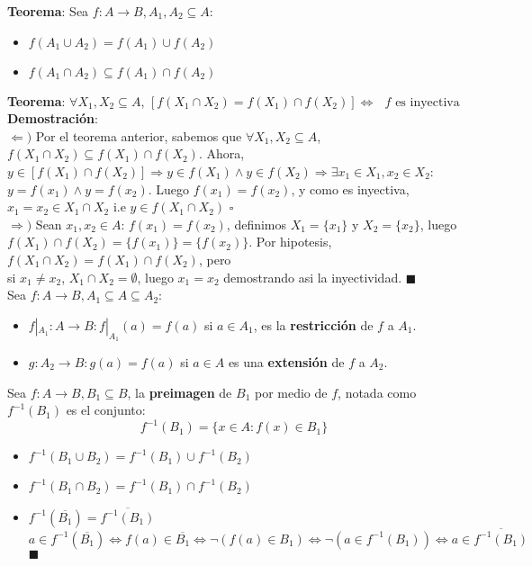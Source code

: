 \documentclass[11pt,a4paper]{article}
\newcommand*{\QEDA}{\null\nobreak\hfill\ensuremath{\blacksquare}}
\newcommand*{\QEDB}{\null\nobreak\hfill\ensuremath{\square}}
\begin{document}
\noindent \textbf{Teorema}: Sea $f:A\rightarrow B, A_1, A_2 \subseteq A$:
\begin{multicols}{2}
\begin{itemize}
\item $f(A_1 \cup A_2) = f(A_1) \cup f(A_2)$
\item $f(A_1 \cap A_2) \subseteq f(A_1) \cap f(A_2)$
\end{itemize}
\end{multicols}
\noindent \textbf{Teorema}: $\forall X_1, X_2 \subseteq A$, $[f(X_1 \cap X_2) = f(X_1) \cap f(X_2)] \iff \text{ $f$ es inyectiva}$\\
\textbf{Demostraci\'on}: \\ 
$\Leftarrow)$ Por el teorema anterior, sabemos que $\forall X_1, X_2 \subseteq A$, $f(X_1 \cap X_2) \subseteq f(X_1) \cap f(X_2)$. Ahora, \\$y\in [f(X_1) \cap f(X_2)] \Rightarrow y \in f(X_1) \land y \in f(X_2) \Rightarrow \exists x_1\in X_1, x_2\in X_2$: $y=f(x_1) \land y=f(x_2)$. Luego $f(x_1) = f(x_2)$, y como es inyectiva, $x_1 = x_2 \in X_1 \cap X_2$ i.e $y\in f(X_1 \cap X_2)$ \QEDB\\
$\Rightarrow)$ Sean $x_1, x_2 \in A$: $f(x_1) = f(x_2)$, definimos $X_1 = \{x_1\}$ y $X_2=\{x_2\}$, luego\\ $f(X_1) \cap f(X_2) = \{f(x_1)\} = \{f(x_2)\}$. Por hipotesis, $f(X_1 \cap X_2) = f(X_1) \cap f(X_2)$, pero\\ si $x_1\not=x_2$, $X_1\cap X_2 = \emptyset$, luego $x_1 = x_2$ demostrando asi la inyectividad. \QEDA\\

\noindent Sea $f:A\rightarrow B, A_1 \subseteq A \subseteq A_2$:
\begin{itemize}
\item $f|_{A_1} : A \rightarrow B : f|_{A_1}(a) = f(a)$ si $a \in A_1$, es la \textbf{restricci\'on} de $f$ a $A_1$.
\item $g : A_2 \rightarrow B : g(a) = f(a)$ si $a \in A$ es una \textbf{extensi\'on} de $f$ a $A_2$.\\
\end{itemize}

\noindent Sea $f: A \rightarrow B, B_1 \subseteq B$, la \textbf{preimagen} de $B_1$ por medio de $f$, notada como $f^{-1}(B_1)$ es el conjunto:
$$f^{-1}(B_1) = \{ x \in A : f(x) \in B_1 \}$$

\begin{itemize}
\item $f^{-1}(B_1 \cup B_2) = f^{-1}(B_1) \cup f^{-1}(B_2)$
\item $f^{-1}(B_1 \cap B_2) = f^{-1}(B_1) \cap f^{-1}(B_2)$
\item $f^{-1}(\overline{B_1}) = \overline{f^{-1}(B_1)}$\\
\indent $a\in f^{-1}(\overline{B_1}) \iff f(a)\in\overline{B_1} \iff \lnot(f(a)\in B_1) \iff \lnot(a\in f^{-1}(B_1)) \iff a \in \overline{f^{-1}(B_1)}$ \QEDA\\
\end{itemize}
\end{document}
